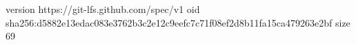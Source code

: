 version https://git-lfs.github.com/spec/v1
oid sha256:d5882e13edac083e3762b3c2e12c9eefc7c71f08ef2d8b11fa15ca479263e2bf
size 69
